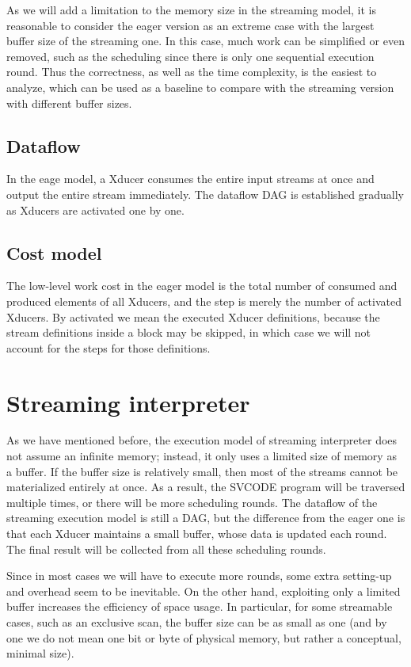 As we will add a limitation to the memory size in the streaming model, it is reasonable to consider the eager version as an extreme case with the largest buffer size of the streaming one. 
In this case, much work can be simplified or even removed, such as the scheduling since there is only one sequential execution round. 
Thus the correctness, as well as the time complexity, is the easiest to analyze, which can be used as a baseline to compare with the streaming version with different buffer sizes.


\subsection{Dataflow}
In the eage model, a Xducer consumes the entire input streams at once and output the entire stream immediately. 
The dataflow DAG is established gradually as Xducers are activated one by one.   

\subsection{Cost model}
The low-level work cost in the eager model is the total number of consumed and produced elements of all Xducers, and the step is merely the number of activated Xducers. 
By activated we mean the executed Xducer definitions, because the stream definitions inside a \wc block may be skipped, in which case we will not account for the steps for those definitions. 


\section{Streaming interpreter}
As we have mentioned before, the execution model of streaming interpreter does not assume an infinite memory; instead, it only uses a limited size of memory as a buffer. 
If the buffer size is relatively small, then most of the streams cannot be materialized entirely at once. 
As a result, the SVCODE program will be traversed multiple times, or there will be more scheduling rounds. 
The dataflow of the streaming execution model is still a DAG, but the difference from the eager one is that each Xducer maintains a small buffer, whose data is updated each round. 
The final result will be collected from all these scheduling rounds.

Since in most cases we will have to execute more rounds, some extra setting-up and overhead seem to be inevitable.
On the other hand, exploiting only a limited buffer increases the efficiency of space usage. 
In particular, for some streamable cases, such as an exclusive scan, the buffer size can be as small as one (and by one we do not mean one bit or byte of physical memory, but rather a conceptual, minimal size).


